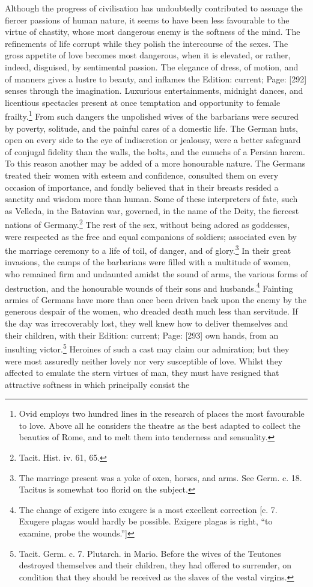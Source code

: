 Although the progress of civilisation has undoubtedly contributed to assuage the fiercer passions of human nature, it seems to have been less favourable to the virtue of chastity, whose most dangerous enemy is the softness of the mind. The refinements of life corrupt while they polish the intercourse of the sexes. The gross appetite of love becomes most dangerous, when it is elevated, or rather, indeed, disguised, by sentimental passion. The elegance of dress, of motion, and of manners gives a lustre to beauty, and inflames the Edition: current; Page: [292] senses through the imagination. Luxurious entertainments, midnight dances, and licentious spectacles present at once temptation and opportunity to female frailty.\footnote{Ovid employs two hundred lines in the research of places the most favourable to love. Above all he considers the theatre as the best adapted to collect the beauties of Rome, and to melt them into tenderness and sensuality.} From such dangers the unpolished wives of the barbarians were secured by poverty, solitude, and the painful cares of a domestic life. The German huts, open on every side to the eye of indiscretion or jealousy, were a better safeguard of conjugal fidelity than the walls, the bolts, and the eunuchs of a Persian harem. To this reason another may be added of a more honourable nature. The Germans treated their women with esteem and confidence, consulted them on every occasion of importance, and fondly believed that in their breasts resided a sanctity and wisdom more than human. Some of these interpreters of fate, such as Velleda, in the Batavian war, governed, in the name of the Deity, the fiercest nations of Germany.\footnote{Tacit. Hist. iv. 61, 65.} The rest of the sex, without being adored as goddesses, were respected as the free and equal companions of soldiers; associated even by the marriage ceremony to a life of toil, of danger, and of glory.\footnote{The marriage present was a yoke of oxen, horses, and arms. See Germ. c. 18. Tacitus is somewhat too florid on the subject.} In their great invasions, the camps of the barbarians were filled with a multitude of women, who remained firm and undaunted amidst the sound of arms, the various forms of destruction, and the honourable wounds of their sons and husbands.\footnote{The change of exigere into exugere is a most excellent correction [c. 7. Exugere plagas would hardly be possible. Exigere plagas is right, \texthebrew{“}to examine, probe the wounds.\texthebrew{}”]} Fainting armies of Germans have more than once been driven back upon the enemy by the generous despair of the women, who dreaded death much less than servitude. If the day was irrecoverably lost, they well knew how to deliver themselves and their children, with their Edition: current; Page: [293] own hands, from an insulting victor.\footnote{Tacit. Germ. c. 7. Plutarch. in Mario. Before the wives of the Teutones destroyed themselves and their children, they had offered to surrender, on condition that they should be received as the slaves of the vestal virgins.} Heroines of such a cast may claim our admiration; but they were most assuredly neither lovely nor very susceptible of love. Whilst they affected to emulate the stern virtues of man, they must have resigned that attractive softness in which principally consist the 